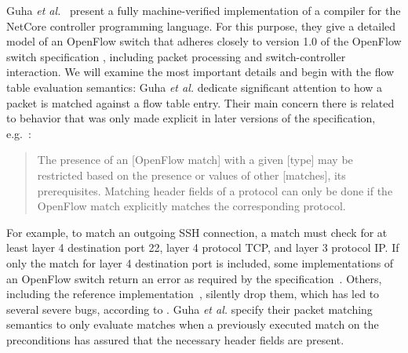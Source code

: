 Guha \emph{et al.}~\cite{guha2013machine} present a fully machine-verified implementation of a compiler for the NetCore controller programming language.
For this purpose, they give a detailed model of an OpenFlow switch that adheres closely to version 1.0 of the OpenFlow switch specification \cite{specification10}, including packet processing and switch-controller interaction.
We will examine the most important details and begin with the flow table evaluation semantics:
Guha \emph{et al.} dedicate significant attention to how a packet is matched against a flow table entry.
Their main concern there is related to behavior that was only made explicit in later versions of the specification, e.g.\ \cite[§7.2.3.6]{specification15}:
\begin{quote}
	The presence of an [OpenFlow match] with a given [type] may be restricted based on the presence or values
	of other [matches], its prerequisites.
	Matching header fields of a protocol can only be done if the OpenFlow match explicitly matches the corresponding protocol.
\end{quote}
For example, to match an outgoing SSH connection, a match must check for at least layer 4 destination port 22, layer 4 protocol TCP, and layer 3 protocol IP.
If only the match for layer 4 destination port is included, some implementations of an OpenFlow switch return an error as required by the specification~\cite[§7.2.6.7]{specification15}.
Others, including the reference implementation~\cite{openvswitch}, silently drop them, which has led to several severe bugs, according to \cite{guha2013machine}.
Guha \emph{et al.} specify their packet matching semantics to only evaluate matches when a previously executed match on the preconditions has assured that the necessary header fields are present.


